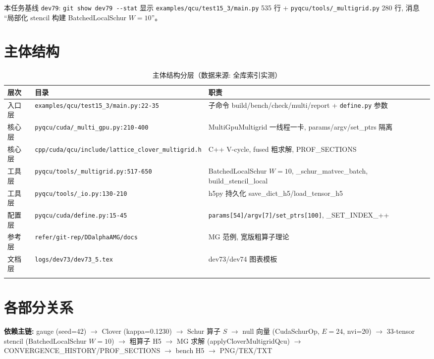 \documentclass[UTF8]{ctexart}
\begin{document}
\noindent 本任务基线 \texttt{\nolinkurl{dev79}}: \texttt{\nolinkurl{git show dev79 --stat}} 显示 \texttt{\nolinkurl{examples/qcu/test15_3/main.py}} 535 行 + \texttt{\nolinkurl{pyqcu/tools/_multigrid.py}} 280 行, 消息 ``局部化 stencil 构建 BatchedLocalSchur $W=10$''。

\section{主体结构}
\begin{xltabular}{\textwidth}{llX}
\toprule
\textcolor{struct}{层次} & 目录 & \textcolor{struct}{职责} \\
\midrule
\endhead
入口层 & \texttt{\nolinkurl{examples/qcu/test15_3/main.py:22-35}} & 子命令 build/bench/check/multi/report + \texttt{\nolinkurl{define.py}} 参数 \\
核心层 & \texttt{\nolinkurl{pyqcu/cuda/_multi_gpu.py:210-400}} & MultiGpuMultigrid 一线程一卡, params/argv/set\_ptrs 隔离 \\
核心层 & \texttt{\nolinkurl{cpp/cuda/qcu/include/lattice_clover_multigrid.h}} & C++ V-cycle, fused 粗求解, PROF\_SECTIONS \\
工具层 & \texttt{\nolinkurl{pyqcu/tools/_multigrid.py:517-650}} & BatchedLocalSchur $W=10$, \_schur\_matvec\_batch, build\_stencil\_local \\
工具层 & \texttt{\nolinkurl{pyqcu/tools/_io.py:130-210}} & h5py 持久化 save\_dict\_h5/load\_tensor\_h5 \\
配置层 & \texttt{\nolinkurl{pyqcu/cuda/define.py:15-45}} & \texttt{\nolinkurl{params[54]/argv[7]/set_ptrs[100]}}, \_SET\_INDEX\_++ \\
参考层 & \texttt{\nolinkurl{refer/git-rep/DDalphaAMG/docs}} & MG 范例, 宽版粗算子理论 \\
文档层 & \texttt{\nolinkurl{logs/dev73/dev73_5.tex}} & dev73/dev74 图表模板 \\
\bottomrule
\caption{主体结构分层（数据来源: 全库索引实测）}
\end{xltabular}

\section{各部分关系}
\begin{keybox}
\textbf{依赖主链:} \textcolor{relation}{gauge (seed=42) $\to$ Clover (kappa=0.1230) $\to$ Schur 算子 $S$ $\to$ null 向量 (CudaSchurOp, $E=24$, nvi=20) $\to$ 33-tensor stencil (BatchedLocalSchur $W=10$) $\to$ 粗算子 H5 $\to$ MG 求解 (applyCloverMultigridQcu) $\to$ CONVERGENCE\_HISTORY/PROF\_SECTIONS $\to$ bench H5 $\to$ PNG/TEX/TXT}
\end{keybox}
\end{document}
